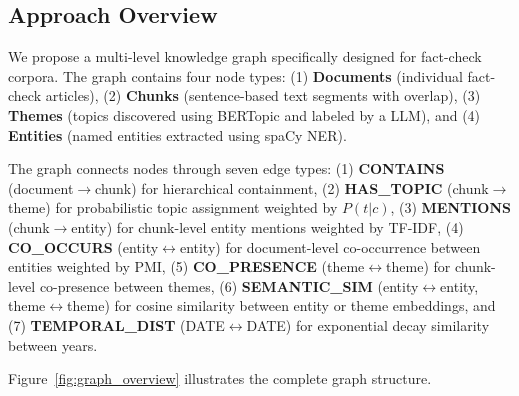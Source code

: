 \documentclass[10pt]{article}
\begin{document}
\subsection{Approach Overview}

We propose a multi-level knowledge graph specifically designed for fact-check corpora. The graph contains four node types: (1) \textbf{Documents} (individual fact-check articles), (2) \textbf{Chunks} (sentence-based text segments with overlap), (3) \textbf{Themes} (topics discovered using BERTopic and labeled by a LLM), and (4) \textbf{Entities} (named entities extracted using spaCy NER).

The graph connects nodes through seven edge types: (1) \textbf{CONTAINS} (document$\to$chunk) for hierarchical containment, (2) \textbf{HAS\_TOPIC} (chunk$\to$theme) for probabilistic topic assignment weighted by $P(t|c)$, (3) \textbf{MENTIONS} (chunk$\to$entity) for chunk-level entity mentions weighted by TF-IDF, (4) \textbf{CO\_OCCURS} (entity$\leftrightarrow$entity) for document-level co-occurrence between entities weighted by PMI, (5) \textbf{CO\_PRESENCE} (theme$\leftrightarrow$theme) for chunk-level co-presence between themes, (6) \textbf{SEMANTIC\_SIM} (entity$\leftrightarrow$entity, theme$\leftrightarrow$theme) for cosine similarity between entity or theme embeddings, and (7) \textbf{TEMPORAL\_DIST} (DATE$\leftrightarrow$DATE) for exponential decay similarity between years.

Figure~\ref{fig:graph_overview} illustrates the complete graph structure.
\end{document}
